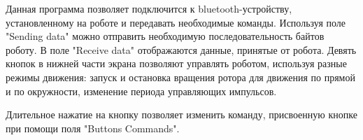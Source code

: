 Данная программа позволяет подключится к bluetooth-устройству, установленному на роботе и передавать необходимые команды. Используя поле "Sending data" можно отправить необходимую последовательность байтов роботу. В поле "Receive data" отображаются данные, принятые от робота. Девять кнопок в нижней части экрана позволяют управлять роботом, используя разные режимы движения: запуск и остановка вращения ротора для движения по прямой и по окружности, изменение периода управляющих импульсов.

Длительное нажатие на кнопку позволяет изменить команду, присвоенную кнопке при помощи поля "Buttons Commands".

%
%
%


\clearpage